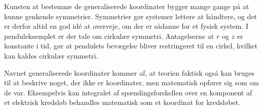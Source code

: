 Kunsten at bestemme de generaliserede koordinater bygger mange gange på at kunne genkende symmetrier. Symmetrier gør systemer lettere at håndtere, og det er derfor altid en god idé at overveje, om der er sådanne for et fysisk system. I penduleksemplet er der tale om cirkulær symmetri. Antagelserne at $r$ og $z$ er konstante i tid, gør at pendulets bevægelse bliver restringeret til en cirkel, hvilket kan kaldes cirkulær symmetri.

Navnet generaliserede koordinater kommer af, at teorien faktisk også kan bruges til at beskrive noget, der ikke er koordinater, men matematisk opfører sig som om de var. Eksempelvis kan integralet af spændingsforskellen over en komponent af et elektrisk kredsløb behandles matematisk som et koordinat for kredsløbet.